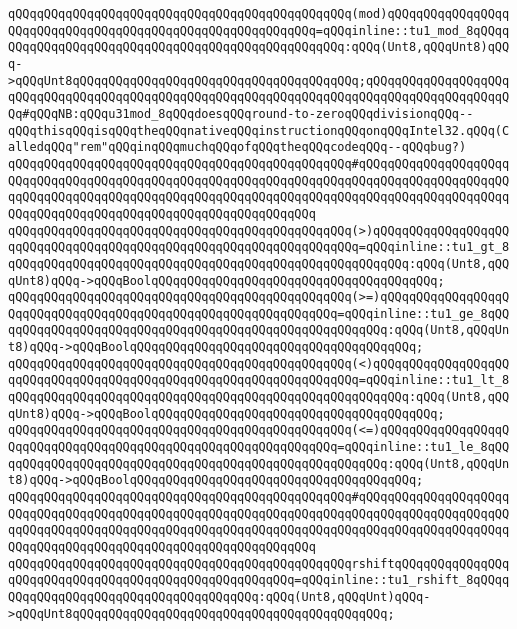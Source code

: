 \verb|qQQqqQQqqQQqqQQqqQQqqQQqqQQqqQQqqQQqqQQqqQQqqQQq(mod)qQQqqQQqqQQqqQQqqQQqqQQqqQQqqQQqqQQqqQQqqQQqqQQqqQQqqQQqqQQq=qQQqinline::tu1_mod_8qQQqqQQqqQQqqQQqqQQqqQQqqQQqqQQqqQQqqQQqqQQqqQQqqQQq:qQQq(Unt8,qQQqUnt8)qQQq->qQQqUnt8qQQqqQQqqQQqqQQqqQQqqQQqqQQqqQQqqQQqqQQq;qQQqqQQqqQQqqQQqqQQqqQQqqQQqqQQqqQQqqQQqqQQqqQQqqQQqqQQqqQQqqQQqqQQqqQQqqQQqqQQqqQQqqQQqqQQq#qQQqNB:qQQqu31mod_8qQQqdoesqQQqround-to-zeroqQQqdivisionqQQq--qQQqthisqQQqisqQQqtheqQQqnativeqQQqinstructionqQQqonqQQqIntel32.qQQq(CalledqQQq"rem"qQQqinqQQqmuchqQQqofqQQqtheqQQqcodeqQQq--qQQqbug?)|\newline
\verb|qQQqqQQqqQQqqQQqqQQqqQQqqQQqqQQqqQQqqQQqqQQqqQQq#qQQqqQQqqQQqqQQqqQQqqQQqqQQqqQQqqQQqqQQqqQQqqQQqqQQqqQQqqQQqqQQqqQQqqQQqqQQqqQQqqQQqqQQqqQQqqQQqqQQqqQQqqQQqqQQqqQQqqQQqqQQqqQQqqQQqqQQqqQQqqQQqqQQqqQQqqQQqqQQqqQQqqQQqqQQqqQQqqQQqqQQqqQQqqQQqqQQqqQQqqQQq|\newline
\verb|qQQqqQQqqQQqqQQqqQQqqQQqqQQqqQQqqQQqqQQqqQQqqQQq(>)qQQqqQQqqQQqqQQqqQQqqQQqqQQqqQQqqQQqqQQqqQQqqQQqqQQqqQQqqQQqqQQqqQQq=qQQqinline::tu1_gt_8qQQqqQQqqQQqqQQqqQQqqQQqqQQqqQQqqQQqqQQqqQQqqQQqqQQqqQQq:qQQq(Unt8,qQQqUnt8)qQQq->qQQqBoolqQQqqQQqqQQqqQQqqQQqqQQqqQQqqQQqqQQqqQQq;|\newline
\verb|qQQqqQQqqQQqqQQqqQQqqQQqqQQqqQQqqQQqqQQqqQQqqQQq(>=)qQQqqQQqqQQqqQQqqQQqqQQqqQQqqQQqqQQqqQQqqQQqqQQqqQQqqQQqqQQqqQQq=qQQqinline::tu1_ge_8qQQqqQQqqQQqqQQqqQQqqQQqqQQqqQQqqQQqqQQqqQQqqQQqqQQqqQQq:qQQq(Unt8,qQQqUnt8)qQQq->qQQqBoolqQQqqQQqqQQqqQQqqQQqqQQqqQQqqQQqqQQqqQQq;|\newline
\verb|qQQqqQQqqQQqqQQqqQQqqQQqqQQqqQQqqQQqqQQqqQQqqQQq(<)qQQqqQQqqQQqqQQqqQQqqQQqqQQqqQQqqQQqqQQqqQQqqQQqqQQqqQQqqQQqqQQqqQQq=qQQqinline::tu1_lt_8qQQqqQQqqQQqqQQqqQQqqQQqqQQqqQQqqQQqqQQqqQQqqQQqqQQqqQQq:qQQq(Unt8,qQQqUnt8)qQQq->qQQqBoolqQQqqQQqqQQqqQQqqQQqqQQqqQQqqQQqqQQqqQQq;|\newline
\verb|qQQqqQQqqQQqqQQqqQQqqQQqqQQqqQQqqQQqqQQqqQQqqQQq(<=)qQQqqQQqqQQqqQQqqQQqqQQqqQQqqQQqqQQqqQQqqQQqqQQqqQQqqQQqqQQqqQQq=qQQqinline::tu1_le_8qQQqqQQqqQQqqQQqqQQqqQQqqQQqqQQqqQQqqQQqqQQqqQQqqQQqqQQq:qQQq(Unt8,qQQqUnt8)qQQq->qQQqBoolqQQqqQQqqQQqqQQqqQQqqQQqqQQqqQQqqQQqqQQq;|\newline
\verb|qQQqqQQqqQQqqQQqqQQqqQQqqQQqqQQqqQQqqQQqqQQqqQQq#qQQqqQQqqQQqqQQqqQQqqQQqqQQqqQQqqQQqqQQqqQQqqQQqqQQqqQQqqQQqqQQqqQQqqQQqqQQqqQQqqQQqqQQqqQQqqQQqqQQqqQQqqQQqqQQqqQQqqQQqqQQqqQQqqQQqqQQqqQQqqQQqqQQqqQQqqQQqqQQqqQQqqQQqqQQqqQQqqQQqqQQqqQQqqQQqqQQqqQQqqQQq|\newline
\verb|qQQqqQQqqQQqqQQqqQQqqQQqqQQqqQQqqQQqqQQqqQQqqQQqrshiftqQQqqQQqqQQqqQQqqQQqqQQqqQQqqQQqqQQqqQQqqQQqqQQqqQQqqQQq=qQQqinline::tu1_rshift_8qQQqqQQqqQQqqQQqqQQqqQQqqQQqqQQqqQQqqQQq:qQQq(Unt8,qQQqUnt)qQQq->qQQqUnt8qQQqqQQqqQQqqQQqqQQqqQQqqQQqqQQqqQQqqQQqqQQq;|\newline
